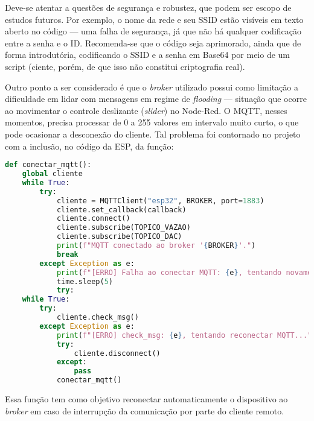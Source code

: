 \documentclass[a4paper,12pt]{article}
\begin{document}
Deve-se atentar a questões de segurança e robustez, que podem ser escopo de estudos futuros. Por exemplo, o nome da rede e seu SSID estão visíveis em texto aberto no código — uma falha de segurança, já que não há qualquer codificação entre a senha e o ID. Recomenda-se que o código seja aprimorado, ainda que de forma introdutória, codificando o SSID e a senha em Base64 por meio de um script (ciente, porém, de que isso não constitui criptografia real).

Outro ponto a ser considerado é que o \textit{broker} utilizado possui como limitação a dificuldade em lidar com mensagens em regime de \textit{flooding} — situação que ocorre ao movimentar o controle deslizante (\textit{slider}) no Node-Red. O MQTT, nesses momentos, precisa processar de 0 a 255 valores em intervalo muito curto, o que pode ocasionar a desconexão do cliente. Tal problema foi contornado no projeto com a inclusão, no código da ESP, da função:

\begin{lstlisting}[language=Python, caption=Função para reconexão automática ao broker MQTT]
def conectar_mqtt():
    global cliente
    while True:
        try:
            cliente = MQTTClient("esp32", BROKER, port=1883)
            cliente.set_callback(callback)
            cliente.connect()
            cliente.subscribe(TOPICO_VAZAO)
            cliente.subscribe(TOPICO_DAC)
            print(f"MQTT conectado ao broker '{BROKER}'.")
            break
        except Exception as e:
            print(f"[ERRO] Falha ao conectar MQTT: {e}, tentando novamente em 5s...")
            time.sleep(5)
            try:
    while True:
        try:
            cliente.check_msg()
        except Exception as e:
            print(f"[ERRO] check_msg: {e}, tentando reconectar MQTT...")
            try:
                cliente.disconnect()
            except:
                pass
            conectar_mqtt()
\end{lstlisting}

Essa função tem como objetivo reconectar automaticamente o dispositivo ao \textit{broker} em caso de interrupção da comunicação por parte do cliente remoto.
\end{document}
